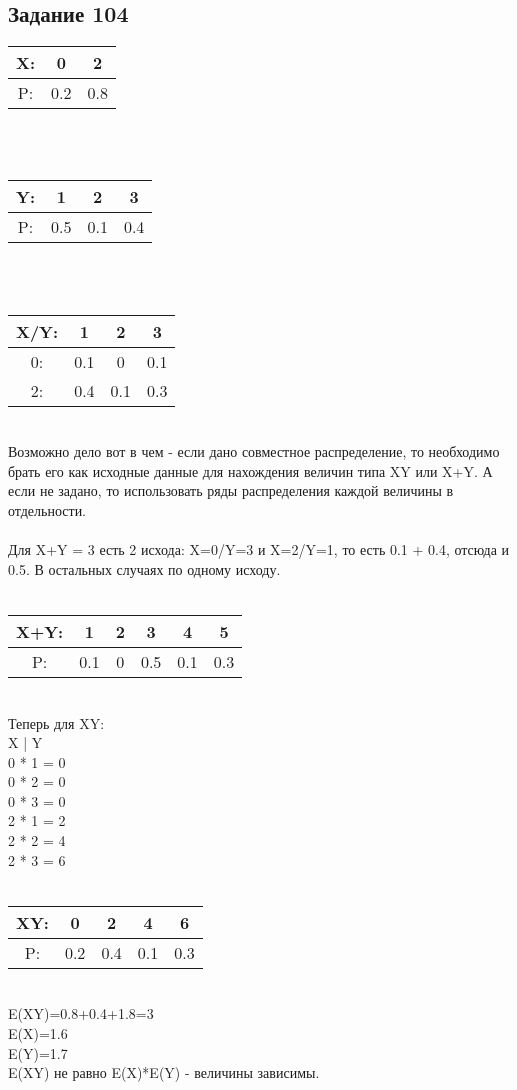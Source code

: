 \documentclass[12pt]{article}
\begin{document}
\subsection{Задание 104}
\begin{tabular}{|c|c|c|}
\hline
X: & 0 & 2  \\
\hline
P: & 0.2 & 0.8  \\
\hline
\end{tabular}
\\
\\
\begin{tabular}{|c|c|c|c|}
\hline
Y: & 1 & 2 & 3  \\
\hline
P: & 0.5 & 0.1 & 0.4  \\
\hline
\end{tabular}
\\
\\
\begin{tabular}{|c|c|c|c|}
\hline
X/Y: & 1 & 2 & 3  \\
\hline
0: & 0.1 & 0 & 0.1  \\
\hline
2: & 0.4 & 0.1 & 0.3  \\
\hline
\end{tabular}
\\
Возможно дело вот в чем - если дано совместное распределение, то необходимо брать его как исходные данные для нахождения величин типа XY или X+Y. А если не задано, то использовать ряды распределения каждой величины в отдельности.\\
\\
Для X+Y = 3 есть 2 исхода: X=0/Y=3 и X=2/Y=1, то есть 0.1 + 0.4, отсюда  и 0.5. В остальных случаях по одному исходу.\\
\\
\begin{tabular}{|c|c|c|c|c|c|}
\hline
X+Y: & 1 & 2 & 3 & 4 & 5 \\
\hline
P: & 0.1 & 0 & 0.5 & 0.1 & 0.3 \\
\hline
\end{tabular}
\\
Теперь для XY:\\
X | Y\\
0 * 1 = 0\\
0 * 2 = 0\\
0 * 3 = 0\\
2 * 1 = 2\\
2 * 2 = 4\\
2 * 3 = 6\\
\\
\begin{tabular}{|c|c|c|c|c|}
\hline
XY: & 0 & 2 & 4 & 6 \\
\hline
P: & 0.2 & 0.4 & 0.1 & 0.3 \\
\hline
\end{tabular}
\\
E(XY)=0.8+0.4+1.8=3\\
E(X)=1.6\\
E(Y)=1.7\\
E(XY) не равно E(X)*E(Y) - величины зависимы.
\newpage
\end{document}
